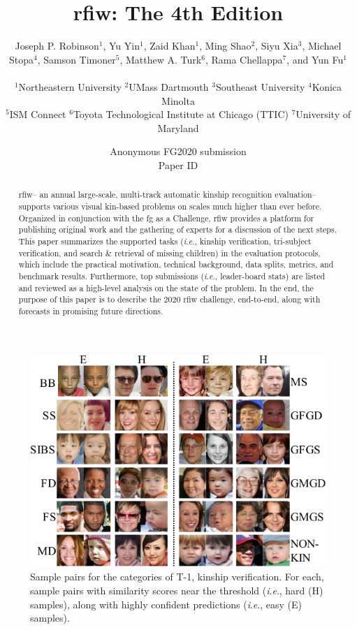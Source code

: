 \documentclass[letterpaper, 10 pt, conference]{ieeeconf}  %
\title{\LARGE \bf
\ac{rfiw}: The 4th Edition
}
\author{\parbox{16cm}{\centering
    {\large Joseph P. Robinson$^1$, Yu Yin$^1$, Zaid Khan$^1$, Ming Shao$^2$,  Siyu Xia$^3$, Michael Stopa$^4$, Samson Timoner$^5$, Matthew A. Turk$^6$, Rama Chellappa$^7$, and Yun Fu$^1$}\\
    {\normalsize
    $^1$Northeastern University $^2$UMass Dartmouth $^3$Southeast University $^4$Konica Minolta \\
   $^5$ISM Connect $^6$Toyota Technological Institute at Chicago (TTIC) $^7$University of Maryland
    
    }
    }
}
\newcommand{\ie}{\textit{i}.\textit{e}., }
\begin{document}
\ifFGfinal
\thispagestyle{empty}
\pagestyle{empty}
\else
\author{Anonymous FG2020 submission\\ Paper ID \FGPaperID \\}
\pagestyle{plain}
\fi
\maketitle

\acresetall

\begin{abstract}
\ac{rfiw}-- an annual large-scale, multi-track automatic kinship recognition evaluation-- supports various visual kin-based problems on scales much higher than ever before. Organized in conjunction with the \gls{fg} as a Challenge, \ac{rfiw} provides a platform for publishing original work and the gathering of experts for a discussion of the next steps. This paper summarizes the supported tasks (\ie kinship verification, tri-subject verification, and search \& retrieval of missing children) in the evaluation protocols, which include the practical motivation, technical background, data splits, metrics, and benchmark results. Furthermore, top submissions (\ie leader-board stats) are listed and reviewed as a high-level analysis on the state of the problem. In the end, the purpose of this paper is to describe the 2020 \ac{rfiw} challenge, end-to-end, along with forecasts in promising future directions.

\end{abstract}

\acresetall
\glsresetall

\begin{figure}[t!]
    \centering
    \includegraphics[width =.9\linewidth]{figures/track1-samples-crop.pdf}
    \caption{Sample pairs for the categories of T-1, kinship verification. For each, sample pairs with similarity scores near the threshold (\ie hard (H) samples), along with highly confident predictions (\ie easy (E) samples).}
    \label{fig:track1:samples}
\end{figure}
\end{document}
